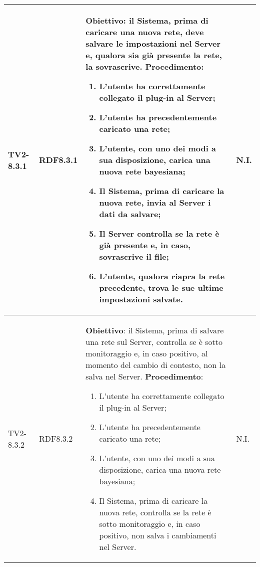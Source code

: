 \begin{longtable}{|C{.15\textwidth}|C{.13\textwidth}|m{.52\textwidth}|C{.08\textwidth}|}
TV2-8.3.1 & RDF8.3.1 &
	\textbf{Obiettivo}: il Sistema, prima di caricare una nuova rete, deve salvare le impostazioni nel Server e, qualora sia già presente la rete, la sovrascrive. \newline
	\textbf{Procedimento}:
	\begin{enumerate}
		\item L'utente ha correttamente collegato il plug-in al Server;
		\item L'utente ha precedentemente caricato una rete;
		\item L'utente, con uno dei modi a sua disposizione, carica una nuova rete bayesiana;
		\item Il Sistema, prima di caricare la nuova rete, invia al Server i dati da salvare;
		\item Il Server controlla se la rete è già presente e, in caso, sovrascrive il file;
		\item L'utente, qualora riapra la rete precedente, trova le sue ultime impostazioni salvate.
	\end{enumerate}
	& N.I. \\
\hline	

TV2-8.3.2 & RDF8.3.2 &
	\textbf{Obiettivo}: il Sistema, prima di salvare una rete sul Server, controlla se è sotto monitoraggio e, in caso positivo, al momento del cambio di contesto, non la salva nel Server. \newline
	\textbf{Procedimento}:
	\begin{enumerate}
		\item L'utente ha correttamente collegato il plug-in al Server;
		\item L'utente ha precedentemente caricato una rete;
		\item L'utente, con uno dei modi a sua disposizione, carica una nuova rete bayesiana;
		\item Il Sistema, prima di caricare la nuova rete, controlla se la rete è sotto monitoraggio e, in caso positivo, non salva i cambiamenti nel Server.
	\end{enumerate}
	& N.I. \\
\hline	


\end{longtable}
